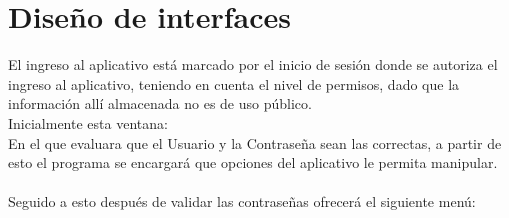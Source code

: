 \section{Dise\~no de interfaces}
El ingreso al aplicativo est\'a marcado por el inicio de sesi\'on donde se autoriza el ingreso al aplicativo, teniendo en cuenta el nivel de permisos, dado que la informaci\'on all\'i almacenada no es de uso p\'ublico.
\\%
Inicialmente esta ventana:
\\%
En el que evaluara que el Usuario y la Contrase\~na sean las correctas, a partir de esto el programa se encargar\'a que opciones del aplicativo le permita manipular.
\\%
\\%
Seguido a esto despu\'es de validar las contrase\~nas ofrecer\'a el siguiente men\'u:
\\%
\\%
%
